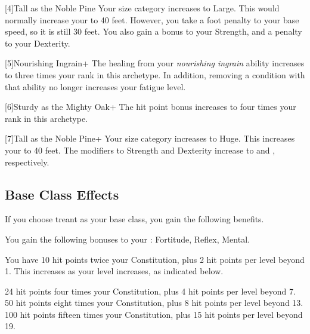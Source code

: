         [4]{Tall as the Noble Pine} Your size category increases to Large.
        This would normally increase your  to 40 feet.
        However, you take a  foot penalty to your base speed, so it is still 30 feet.
        You also gain a  bonus to your Strength, and a  penalty to your Dexterity.

        [5]{Nourishing Ingrain+} The healing from your \textit{nourishing ingrain} ability increases to three times your rank in this archetype.
        In addition, removing a condition with that ability no longer increases your fatigue level.

        [6]{Sturdy as the Mighty Oak+} The hit point bonus increases to four times your rank in this archetype.

        [7]{Tall as the Noble Pine+} Your size category increases to Huge.
        This increases your  to 40 feet.
        The modifiers to Strength and Dexterity increase to  and , respectively.

    \subsection{Base Class Effects}
        If you choose treant as your base class, you gain the following benefits.

        You gain the following bonuses to your :  Fortitude,  Reflex,  Mental.

            You have 10 hit points \add twice your Constitution, plus 2 hit points per level beyond 1.
            This increases as your level increases, as indicated below.
            \begin{itemize}
                 24 hit points \add four times your Constitution, plus 4 hit points per level beyond 7.
                 50 hit points \add eight times your Constitution, plus 8 hit points per level beyond 13.
                 100 hit points \add fifteen times your Constitution, plus 15 hit points per level beyond 19.
            \end{itemize}

